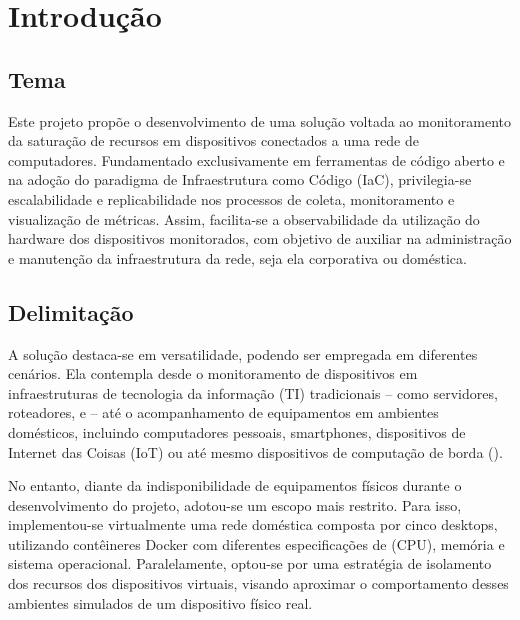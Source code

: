 \chapter{Introdução}
\label{chap1}

\section{Tema}

Este projeto propõe o desenvolvimento de uma solução voltada ao monitoramento da saturação de recursos em dispositivos conectados a uma rede de computadores. Fundamentado exclusivamente em ferramentas de código aberto e na adoção do paradigma de Infraestrutura como Código (IaC), privilegia-se escalabilidade e replicabilidade nos processos de coleta, monitoramento e visualização de métricas. Assim, facilita-se a observabilidade da utilização do hardware dos dispositivos monitorados, com objetivo de auxiliar na administração e manutenção da infraestrutura da rede, seja ela corporativa ou doméstica.

\section{Delimitação}
\label{section:Delimitação}

A solução destaca-se em versatilidade, podendo ser empregada em diferentes cenários. Ela contempla desde o monitoramento de dispositivos em infraestruturas de tecnologia da informação (TI) tradicionais -- como servidores, roteadores,  e  -- até o acompanhamento de equipamentos em ambientes domésticos, incluindo computadores pessoais, smartphones, dispositivos de Internet das Coisas (IoT) ou até mesmo dispositivos de computação de borda ().

No entanto, diante da indisponibilidade de equipamentos físicos durante o desenvolvimento do projeto, adotou-se um escopo mais restrito. Para isso, implementou-se virtualmente uma rede doméstica composta por cinco desktops, utilizando contêi\-neres Docker com diferentes especificações de  (CPU), memória e sistema operacional. Paralelamente, optou-se por uma estratégia de isolamento dos recursos dos dispositivos virtuais, visando aproximar o comportamento desses ambientes simulados de um dispositivo físico real.

